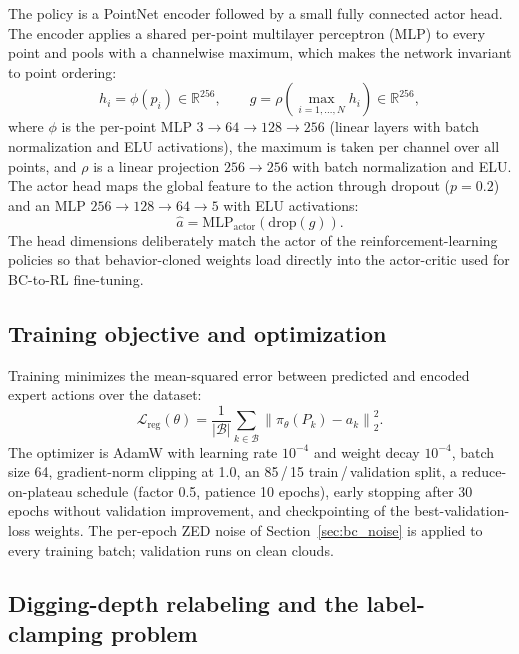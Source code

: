 The policy is a PointNet encoder followed by a small fully connected actor
head. The encoder applies a shared per-point multilayer perceptron (MLP) to
every point and pools with a channelwise maximum, which makes the network
invariant to point ordering:
\begin{equation}
  h_i = \phi(p_i) \in \mathbb{R}^{256}, \qquad
  g = \rho\!\left( \max_{i = 1, \dots, N} h_i \right) \in \mathbb{R}^{256},
  \label{eq:pointnet}
\end{equation}
where $\phi$ is the per-point MLP $3 \to 64 \to 128 \to 256$ (linear layers
with batch normalization and ELU activations), the maximum is taken per
channel over all points, and $\rho$ is a linear projection $256 \to 256$ with
batch normalization and ELU. The actor head maps the global feature to the
action through dropout ($p = 0.2$) and an MLP $256 \to 128 \to 64 \to 5$ with
ELU activations:
\begin{equation}
  \hat{a} = \mathrm{MLP}_{\mathrm{actor}}\!\left( \mathrm{drop}(g) \right).
\end{equation}
The head dimensions deliberately match the actor of the reinforcement-learning
policies so that behavior-cloned weights load directly into the actor-critic
used for BC-to-RL fine-tuning.

\subsection{Training objective and optimization}

Training minimizes the mean-squared error between predicted and encoded expert
actions over the dataset:
\begin{equation}
  \mathcal{L}_{\mathrm{reg}}(\theta) =
  \frac{1}{|\mathcal{B}|} \sum_{k \in \mathcal{B}}
  \left\lVert \pi_\theta(P_k) - a_k \right\rVert_2^2 .
  \label{eq:mse}
\end{equation}
The optimizer is AdamW with learning rate $10^{-4}$ and weight decay
$10^{-4}$, batch size 64, gradient-norm clipping at 1.0, an
85\,/\,15 train\,/\,validation split, a reduce-on-plateau schedule (factor
0.5, patience 10 epochs), early stopping after 30 epochs without validation
improvement, and checkpointing of the best-validation-loss weights. The
per-epoch ZED noise of Section~\ref{sec:bc_noise} is applied to every training
batch; validation runs on clean clouds.

\subsection{Digging-depth relabeling and the label-clamping problem}
\label{sec:bc_dig}

